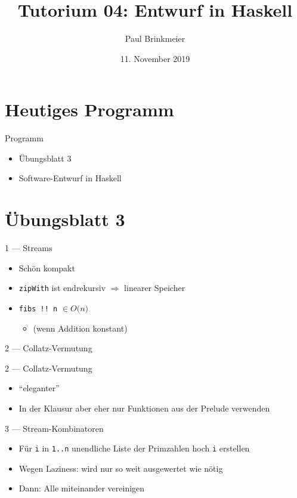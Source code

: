 \documentclass{beamer}
\title{Tutorium 04: Entwurf in Haskell}
\author{Paul Brinkmeier}
\institute{Tutorium Programmierparadigmen am KIT}
\date{11. November 2019}
\newcommand{\code}[1]{
	\begin{mdframed}
		
	\end{mdframed}
}
\begin{document}
\begin{frame}
	\titlepage
\end{frame}

\section{Heutiges Programm}
\begin{frame}{Programm}
	\begin{itemize}
		\item Übungsblatt 3
		\item Software-Entwurf in Haskell
	\end{itemize}
\end{frame}

\section{Übungsblatt 3}

\begin{frame}{1 --- Streams}
	\code{demos/Fibs.hs}

	\begin{itemize}
		\item Schön kompakt
		\item \texttt{zipWith} ist endrekursiv $\Rightarrow$ linearer Speicher 
		\item \texttt{fibs !! n} $\in O($\pause$n)$
		\begin{itemize}
			\item (wenn Addition konstant)
		\end{itemize}
	\end{itemize}
\end{frame}

\begin{frame}{2 --- Collatz-Vermutung}
	\code{demos/Collatz.hs}
\end{frame}

\begin{frame}{2 --- Collatz-Vermutung}
	\code{demos/CollatzAlt.hs}

	\begin{itemize}
		\item \enquote{eleganter}
		\item In der Klausur aber eher nur Funktionen aus der Prelude verwenden
	\end{itemize}
\end{frame}

\begin{frame}{3 --- Stream-Kombinatoren}
	\code{demos/Merge.hs}

	\begin{itemize}
		\item Für \texttt{i} in \texttt{1..n} unendliche Liste der Primzahlen hoch \texttt{i} erstellen
		\item Wegen Laziness: wird nur so weit ausgewertet wie nötig
		\item Dann: Alle miteinander vereinigen
	\end{itemize}
\end{frame}
\end{document}
